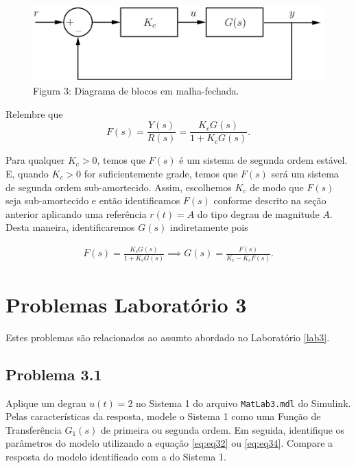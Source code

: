 \documentclass[
]{book}
\theoremstyle{definition}
\theoremstyle{definition}
\theoremstyle{definition}
\theoremstyle{remark}
\begin{document}
\begin{figure}
\centering
\includegraphics{Imagens/Lab3/Explicação/fig3.jpg}
\caption{Figura 3: Diagrama de blocos em malha-fechada.}
\end{figure}

Relembre que
\[
F(s) = \frac {Y(s)}{R(s)} = \frac {K_cG(s)}{1+K_cG(s)}.
\]

Para qualquer \(K_c > 0\), temos que \(F(s)\) é um sistema de segunda ordem estável. E, quando \(K_c > 0\) for suficientemente grade, temos que \(F(s)\) será um sistema de segunda ordem sub-amortecido. Assim, escolhemos \(K_c\) de modo que \(F(s)\) seja sub-amortecido e então identificamos \(F(s)\) conforme descrito na seção anterior aplicando uma referência \(r(t) = A\) do tipo degrau de magnitude \(A\). Desta maneira, identificaremos \(G(s)\) indiretamente pois

\begin{align}
F(s) = \frac {K_cG(s)}{1+K_cG(s)} \implies G(s) = \frac {F(s)}{K_c - K_cF(s)}.  \label{eq:eq35}
\end{align}

\hypertarget{problemas-laboratuxf3rio-3}{%
\chapter*{Problemas Laboratório 3}\label{problemas-laboratuxf3rio-3}}

Estes problemas são relacionados ao assunto abordado no Laboratório \ref{lab3}.

\hypertarget{problema-3.1}{%
\section*{Problema 3.1}\label{problema-3.1}}

Aplique um degrau \(u(t) = 2\) no Sistema 1 do arquivo \texttt{MatLab3.mdl} do Simulink. Pelas características da resposta, modele o Sistema 1 como uma Função de Transferência \(G_1(s)%
\) de primeira ou segunda ordem. Em seguida, identifique os parâmetros do modelo utilizando a equação \eqref{eq:eq32} ou \eqref{eq:eq34}. Compare a resposta do modelo identificado com a do Sistema 1.
\end{document}
